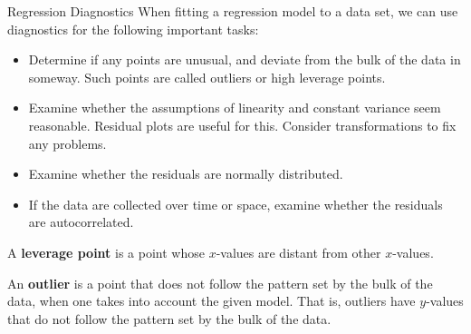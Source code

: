 \documentclass[10pt]{beamer}
\begin{document}
\begin{frame}{Regression Diagnostics}
When fitting a regression model to a data set, we can use diagnostics for the following important tasks:
\vspace{5pt}
\begin{itemize}
\item Determine if any points are unusual, and deviate from the bulk of the data in someway.  Such points are called outliers or high leverage points.
\vspace{5pt}
\item Examine whether the assumptions of linearity and constant variance seem reasonable.  Residual plots are useful for this.  Consider transformations to fix any problems.
\vspace{5pt}
\item Examine whether the residuals are normally distributed.
\vspace{5pt}
\item If the data are collected over time or space, examine whether the residuals are autocorrelated.
\end{itemize}
\end{frame}

\begin{frame}
A \textbf{leverage point} is a point whose $x$-values are distant from other $x$-values.\\ 
\vspace{15pt}

An \textbf{outlier} is a point that does not follow the pattern set by the bulk of the data, when one takes into account the given model.  That is, outliers have $y$-values that do not follow the pattern set by the bulk of the data. 
\end{frame}
\end{document}
